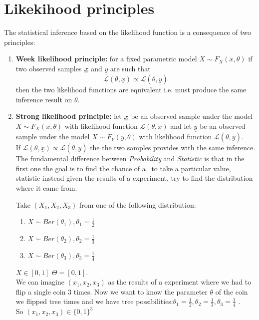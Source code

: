 \section{Likekihood principles}
The statistical inference based on the likelihood function is a consequence of two principles:
\begin{enumerate}
	\item \textbf{Week likelihood principle:} for a fixed parametric model $X\sim F_X(x,\theta)$ if two observed samples $\underline x$ and $ \underline{y}$ are such that $$\mathcal{L}(\theta,\underline x) \propto \mathcal{L}(\theta,\underline y)$$ 
	then the two likelihood functions are equivalent i.e. must produce the same inference result on $\theta$.
	\item \textbf{Strong likelihood principle:} let $\underline x$ be an observed sample under the model $X\sim F_X(x,\theta)$ with likelihood function $\mathcal{L}(\theta,\underline x)$ and let $\underline y$ be an observed sample under the model $X\sim F_Y(y,\theta)$ with likelihood function $\mathcal{L}(\theta,\underline y)$.\\
	If $\mathcal{L}(\theta,\underline x) \propto \mathcal{L}(\theta,\underline y)$ the the two samples provides with the same inference.\\
	
	
	The fundamental difference between \textit{Probability} and \textit{Statistic} is that in the first one the goal is to find the chance of a \rv \ to take a particular value, statistic instead given the results of a experiment, try to find the distribution where it came from.\\
	\begin{eg}
		Take $(X_1,X_2,X_3)$ from one of the following distribution:
		\begin{enumerate}
			\item $X\sim Ber(\theta_1), \theta_1=\frac{1}{2}$
			\item $X\sim Ber(\theta_2), \theta_2=\frac{1}{3}$
			\item $X\sim Ber(\theta_3), \theta_3=\frac{1}{4}$
		\end{enumerate}
	$X\in [0,1]$ $\Theta = [0,1]$.\\
	We can imagine $(x_1,x_2,x_3)$ as the results of a experiment where we had to flip a single coin 3 times. Now we want to know the parameter $\theta$ of the coin we flipped tree times and we have tree possibilities:$\theta_1=\frac{1}{2}, \theta_2=\frac{1}{3}, \theta_3=\frac{1}{4}$ .
	\\So $(x_1,x_2,x_3)\in \{0 ,1 \}^3$
	

\end{eg}
\end{enumerate}
